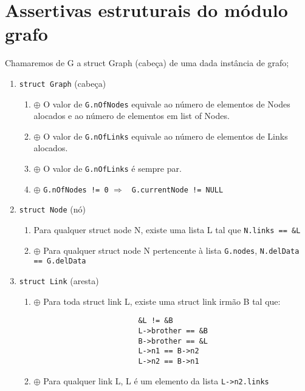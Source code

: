 \documentclass[a4paper,8pt]{article}
\begin{document}
\section{Assertivas estruturais do módulo grafo}

Chamaremos de G a struct Graph (cabeça) de uma dada instância de grafo;

\begin{enumerate}

\item \texttt{struct Graph} (cabeça)
		\begin{enumerate}
				\item $\oplus$ O valor de \texttt{G.nOfNodes} equivale ao número de
					elementos de Nodes alocados e ao número de elementos em
					list of Nodes.
				\item $\oplus$ O valor de \texttt{G.nOfLinks} equivale ao número de
					elementos de Links alocados.
				\item $\oplus$ O valor de \texttt{G.nOfLinks} é sempre par.
				\item $\oplus$ \texttt{G.nOfNodes != 0} $\Rightarrow$
					\texttt{ G.currentNode != NULL}
		\end{enumerate}

\item \texttt{struct Node} (nó)
		\begin{enumerate}
				\item Para qualquer struct node N, existe uma lista L tal
					que \newline \texttt{N.links == \&L}
				\item $\oplus$ Para qualquer struct node N pertencente à lista
					\texttt{G.nodes}, \newline \texttt{N.delData == G.delData}
		\end{enumerate}

\item \texttt{struct Link} (aresta)
		\begin{enumerate}
				\item $\oplus$ Para toda struct link L, existe uma struct link irmão
					B tal que:
				\begin{verbatim}
						&L != &B
						L->brother == &B
						B->brother == &L
						L->n1 == B->n2
						L->n2 == B->n1
						\end{verbatim}
				\item $\oplus$ Para qualquer link L, L é um elemento da lista
					\texttt{L->n2.links}
		\end{enumerate}
\end{enumerate}
\end{document}
